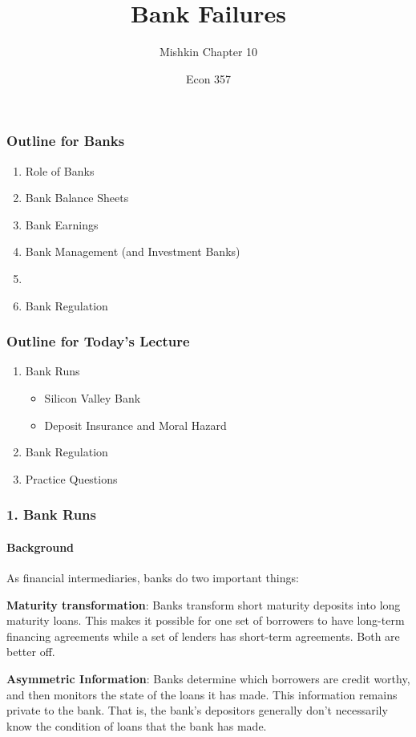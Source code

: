 \documentclass{beamer}
\title{Bank Failures}
\subtitle{Mishkin Chapter 10}
\author{Econ 357}
\date{\week}
\begin{document}
\frame{\titlepage}

\begin{frame}
    \frametitle{Outline for Banks}
        \begin{enumerate}
            \item Role of Banks
            \item Bank Balance Sheets
            \item Bank Earnings
            \item Bank Management (and Investment Banks)
            \item {}
            \item Bank Regulation
        \end{enumerate}
\end{frame}


\begin{frame}
    \frametitle{Outline for Today's Lecture}
    
    \begin{enumerate}
        \item Bank Runs
        \begin{itemize}
            \item Silicon Valley Bank
            \item Deposit Insurance and Moral Hazard
        \end{itemize}
        \item Bank Regulation
        \item Practice Questions
    \end{enumerate}

\end{frame}


\begin{frame}[t]
\frametitle{1. Bank Runs}
\framesubtitle{Background}

    As financial intermediaries, banks do two important things:
    \vspace{1em}
    
    \textbf{Maturity transformation}:   Banks transform short maturity deposits into long maturity loans.   This makes it possible for one set of borrowers to have long-term financing agreements while a set of lenders has short-term agreements.   Both are better off. 
    \vspace{1em}
    
    \textbf{Asymmetric Information}: Banks determine which borrowers are credit worthy, and then monitors the state of the loans it has made.  This information remains private to the bank.   That is, the bank’s depositors generally don’t necessarily know the condition of loans that the bank has made. 

\end{frame}
\end{document}
